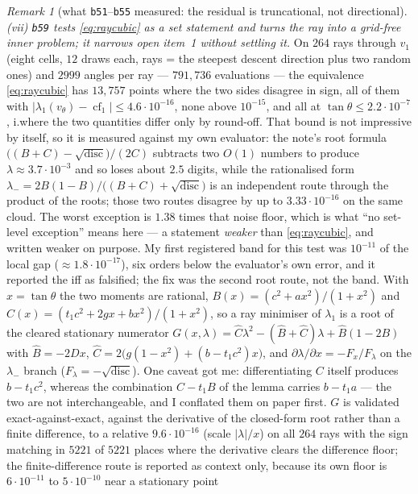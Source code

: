 \documentclass[11pt]{article}
\theoremstyle{remark}
\newtheorem{remark}{Remark}[section]
\begin{document}
\begin{remark}[what \texttt{b51}--\texttt{b55} measured: the residual is truncational, not directional]
\emph{(vii) \texttt{b59} tests \eqref{eq:raycubic} as a \emph{set} statement and turns the ray into a
grid-free inner problem; it narrows open item~1 without settling it.} On $264$ rays through $v_1$
(eight cells, $12$ draws each, rays = the steepest descent direction plus two random ones) and
$2999$ angles per ray --- $791{,}736$ evaluations --- the equivalence \eqref{eq:raycubic} has
$13{,}757$ points where the two sides disagree in sign, all of them with
$|\lambda_1(v_\theta)-\operatorname{cf}_1|\le4.6\cdot10^{-16}$, none above $10^{-15}$, and all at
$\tan\theta\le2.2\cdot10^{-7}$, i.\@ where the two quantities differ only by round-off. That bound is
not impressive by itself, so it is measured against my own evaluator: the note's root formula
$\bigl((B+C)-\sqrt{\operatorname{disc}}\bigr)/(2C)$ subtracts two $O(1)$ numbers to produce $\lambda\approx3.7\cdot10^{-3}$
and so loses about $2.5$ digits, while the rationalised form
$\lambda_-=2B(1-B)/\bigl((B+C)+\sqrt{\operatorname{disc}}\bigr)$ is an independent route through the product of the
roots; those two routes disagree by up to $3.33\cdot10^{-16}$ on the same cloud. The worst exception is
$1.38$ times that noise floor, which is what ``no set-level exception'' means here --- a statement
\emph{weaker} than \eqref{eq:raycubic}, and written weaker on purpose. My first registered band for this
test was $10^{-11}$ of the local gap ($\approx1.8\cdot10^{-17}$), six orders below the evaluator's own
error, and it reported the iff as falsified; the fix was the second root route, not the band.
With $x=\tan\theta$ the two moments are rational, $B(x)=(c^{2}+ax^{2})/(1+x^{2})$ and
$C(x)=(t_1c^{2}+2gx+bx^{2})/(1+x^{2})$, so a ray minimiser of $\lambda_1$ is a root of the cleared
stationary numerator
$G(x,\lambda)=\hat C\lambda^{2}-(\hat B+\hat C)\lambda+\hat B(1-2B)$ with
$\hat B=-2Dx$, $\hat C=2\bigl(g(1-x^{2})+(b-t_1c^{2})x\bigr)$, and $\partial\lambda/\partial x=-F_x/F_\lambda$
on the $\lambda_-$ branch ($F_\lambda=-\sqrt{\operatorname{disc}}$). One caveat got me: differentiating $C$ itself
produces $b-t_1c^{2}$, whereas the combination $C-t_1B$ of the lemma carries $b-t_1a$ --- the two are not
interchangeable, and I conflated them on paper first. $G$ is validated exact-against-exact, against the
derivative of the closed-form root rather than a finite difference, to a relative
$9.6\cdot10^{-16}$ (scale $|\lambda|/x$) on all $264$ rays with the sign matching in $5221$ of $5221$
places where the derivative clears the difference floor; the finite-difference route is reported as
context only, because its own floor is $6\cdot10^{-11}$ to $5\cdot10^{-10}$ near a stationary point

\end{remark}
\end{document}
